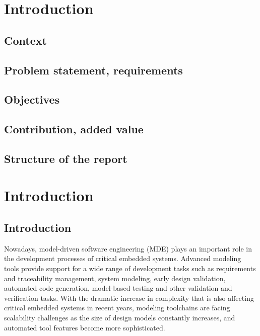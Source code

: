\chapter{Introduction}
\label{chap:introduction}

\section{Context}

\section{Problem statement, requirements}

\section{Objectives}

\section{Contribution, added value}

\section{Structure of the report}



\chapter{Introduction}

\section{Introduction}
\label{sec:intro}

Nowadays, model-driven software engineering (MDE) plays an important role in the development processes of critical embedded systems. Advanced modeling tools provide support for a wide range of development tasks such as requirements and traceability management, system modeling, early design validation, automated code generation, model-based testing and other validation and verification tasks. 
With the dramatic increase in complexity that is also affecting critical embedded systems in recent years, modeling toolchains are facing scalability challenges as the size of design models constantly increases, and automated tool features become more sophisticated.

